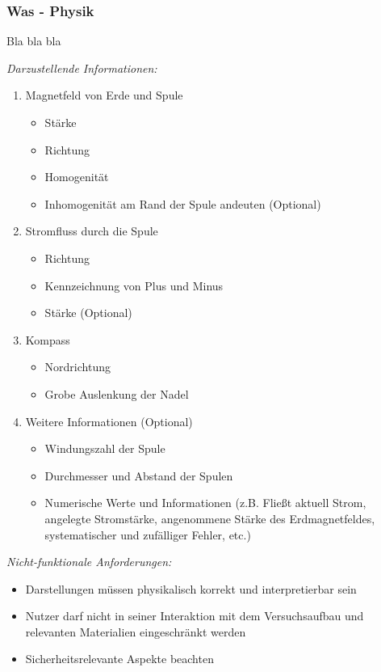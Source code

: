 \subsubsection{Was - Physik}
Bla bla bla

\textit{Darzustellende Informationen:}
\begin{enumerate}
	\setlength{\itemsep}{-5pt}
	\item Magnetfeld von Erde und Spule
	\begin{itemize}[topsep=-0.25em]
		\setlength{\itemsep}{-0.25em}
		\item Stärke
		\item Richtung
		\item Homogenität
		\item Inhomogenität am Rand der Spule andeuten (Optional) 
	\end{itemize}
	\item Stromfluss durch die Spule
	\begin{itemize}[topsep=-0.25em]
		\setlength{\itemsep}{-0.25em}
		\item Richtung
		\item Kennzeichnung von Plus und Minus
		\item Stärke (Optional) 
	\end{itemize}
	\item Kompass
	\begin{itemize}[topsep=-0.25em]
		\setlength{\itemsep}{-0.25em}
		\item Nordrichtung
		\item Grobe Auslenkung der Nadel
	\end{itemize}
	\item Weitere Informationen (Optional)
	\begin{itemize}[topsep=-0.25em]
		\setlength{\itemsep}{-0.25em}
		\item Windungszahl der Spule
		\item Durchmesser und Abstand der Spulen
		\item Numerische Werte und Informationen (z.B. Fließt aktuell Strom, angelegte Stromstärke, angenommene Stärke des Erdmagnetfeldes, systematischer und zufälliger Fehler, etc.)
	\end{itemize}
\end{enumerate}

\textit{Nicht-funktionale Anforderungen:}
\begin{itemize}
	\setlength{\itemsep}{-5pt}
	\item Darstellungen müssen physikalisch korrekt und interpretierbar sein
	\item Nutzer darf nicht in seiner Interaktion mit dem Versuchsaufbau und relevanten Materialien eingeschränkt werden
	\item Sicherheitsrelevante Aspekte beachten
\end{itemize}


